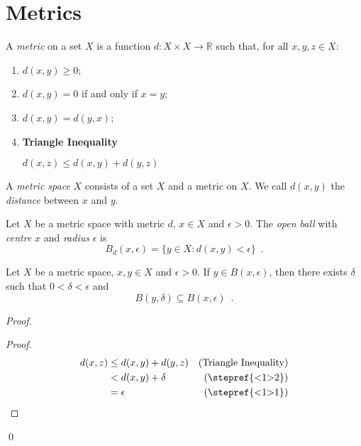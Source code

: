 \section{Metrics}

\begin{df}[Metric]
  A \emph{metric} on a set $X$ is a function $d : X \times X \rightarrow
  \mathbb{R}$ such that, for all $x, y, z \in X$:
  \begin{enumerate}
    \item $d(x, y) \geq 0$;
    \item $d(x, y) = 0$ if and only if $x = y$;
    \item $d(x, y) = d(y, x)$;
    \item \textbf{Triangle Inequality}

    $d(x, z) \leq d(x, y) + d(y, z)$
  \end{enumerate}
  A \emph{metric space} $X$ consists of a set $X$ and a metric on $X$. We
  call $d(x, y)$ the \emph{distance} between $x$ and $y$.
\end{df}

\begin{df}
  Let $X$ be a metric space with metric $d$, $x \in X$ and $\epsilon > 0$.
  The \emph{open       ball} with \emph{centre} $x$ and \emph{radius}
  $\epsilon$
  is
  \[ B_d(x, \epsilon) = \{ y \in X : d(x, y) < \epsilon \} \enspace . \]
\end{df}

\begin{lm}
  \label{lm:topology:metric:balls}
  Let $X$ be a metric space, $x, y \in X$ and $\epsilon > 0$. If $y \in B(x,
  \epsilon)$, then there exists $\delta$ such that $0 < \delta < \epsilon$ and
  \[ B(y, \delta) \subseteq B(x, \epsilon) \enspace . \]
\end{lm}

\begin{proof}
  \pf
  \begin{proof}
    \pf
    \begin{align*}
      d(x, z) & \leq d(x, y) + d(y, z) & (\text{Triangle Inequality}) \\
      & < d(x, y) + \delta & (\text{\stepref{<1>2}}) \\
      & = \epsilon & (\text{\stepref{<1>1}})
    \end{align*}
  \end{proof}
  \qed
\end{proof}
